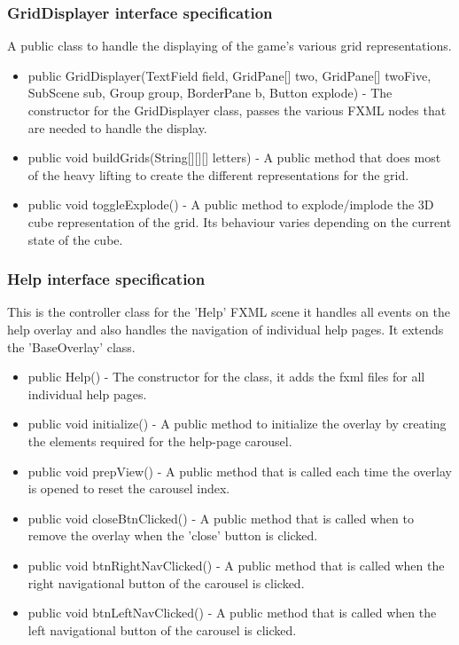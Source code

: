         \subsubsection{GridDisplayer interface specification}
        	A public class to handle the displaying of the game's various grid representations.
            \begin{itemize}
            	\item public GridDisplayer(TextField field, GridPane[] two, GridPane[] twoFive, SubScene sub, Group group, BorderPane b, Button explode) - The constructor for the GridDisplayer class, passes the various FXML nodes that are needed to handle the display.
                \item public void buildGrids(String[][][] letters) - A public method that does most of the heavy lifting to create the different representations for the grid.
                \item public void toggleExplode() - A public method to explode/implode the 3D cube representation of the grid. Its behaviour varies depending on the current state of the cube.
            \end{itemize}
 
        \subsubsection{Help interface specification}
        	This is the controller class for the 'Help' FXML scene it handles all events on the help overlay and also handles the navigation of individual help pages. It extends the 'BaseOverlay' class.
            \begin{itemize}
            	\item public Help() - The constructor for the class, it adds the fxml files for all individual help pages.
                \item public void initialize() - A public method to initialize the overlay by creating the elements required for the help-page carousel.
                \item public void prepView() - A public method that is called each time the overlay is opened to reset the carousel index.
                \item public void closeBtnClicked() - A public method that is called when to remove the overlay when the 'close' button is clicked.
                \item public void btnRightNavClicked() - A public method that is called when the right navigational button of the carousel is clicked.
                \item public void btnLeftNavClicked() - A public method that is called when the left navigational button of the carousel is clicked.
            \end{itemize}

